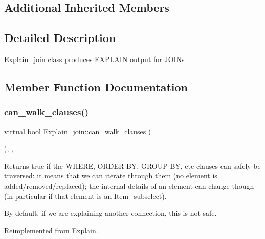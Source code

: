 \subsection*{Additional Inherited Members}


\subsection{Detailed Description}
\mbox{\hyperlink{classExplain__join}{Explain\+\_\+join}} class produces E\+X\+P\+L\+A\+IN output for J\+O\+I\+Ns 

\subsection{Member Function Documentation}
\mbox{\label{classExplain__join_a1efc6984153eb72810c7e960f9855dac}} 
\subsubsection{\texorpdfstring{can\+\_\+walk\+\_\+clauses()}{can\_walk\_clauses()}}
{\footnotesize\ttfamily virtual bool Explain\+\_\+join\+::can\+\_\+walk\+\_\+clauses (\begin{DoxyParamCaption}{ }\end{DoxyParamCaption})\hspace{0.3cm}{\ttfamily [inline]}, {\ttfamily [protected]}, {\ttfamily [virtual]}}

Returns true if the W\+H\+E\+RE, O\+R\+D\+ER BY, G\+R\+O\+UP BY, etc clauses can safely be traversed\+: it means that we can iterate through them (no element is added/removed/replaced); the internal details of an element can change though (in particular if that element is an \mbox{\hyperlink{classItem__subselect}{Item\+\_\+subselect}}).

By default, if we are explaining another connection, this is not safe. 

Reimplemented from \mbox{\hyperlink{classExplain_a82fdfa033238cfb356903c475ef4a177}{Explain}}.

\mbox{\label{classExplain__join_a1f6b913e82a260fe431e3faa4dbfa68a}} 
